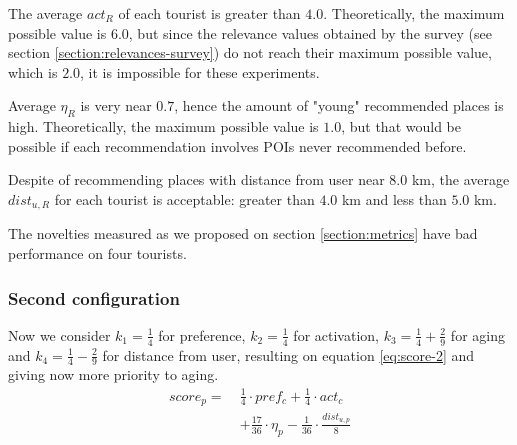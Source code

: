 The average $act_R$ of each tourist is greater than $4.0$. Theoretically, the maximum possible value is $6.0$, but since the relevance values obtained by the survey (see section \ref{section:relevances-survey}) do not reach their maximum possible value, which is $2.0$, it is impossible for these experiments.

Average $\eta_R$ is very near $0.7$, hence the amount of "young" recommended places is high. Theoretically, the maximum possible value is $1.0$, but that would be possible if each recommendation involves POIs never recommended before.

Despite of recommending places with distance from user near $8.0$ km, the average $dist_{u,R}$ for each tourist is acceptable: greater than $4.0$ km and less than $5.0$ km. 

The novelties measured as we proposed on section \ref{section:metrics} have bad performance on four tourists.

\subsubsection{Second configuration}
Now we consider $k_1 = \frac{1}{4}$ for preference, $k_2 = \frac{1}{4}$ for activation, $k_3 = \frac{1}{4} + \frac{2}{9}$ for aging and $k_4 = \frac{1}{4} - \frac{2}{9}$ for distance from user, resulting on equation \ref{eq:score-2} and giving now more priority to aging.
\begin{equation} \label{eq:score-2}
    \begin{split}
        score_p = \ &\frac{1}{4} \cdot pref_c + \frac{1}{4} \cdot act_c \\
                                        &+ \frac{17}{36} \cdot \eta_p - \frac{1}{36} \cdot \frac{dist_{u,p}}{8}
    \end{split}
\end{equation}